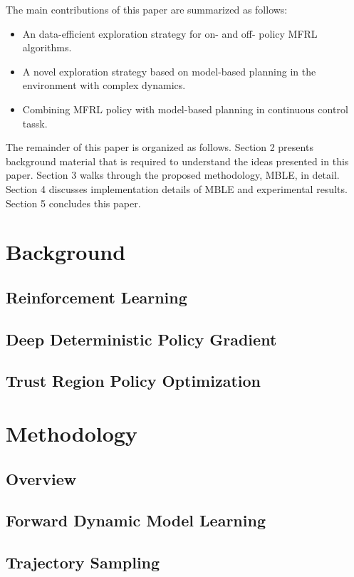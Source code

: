 \documentclass{article} %
\begin{document}
The main contributions of this paper are summarized as follows:
\begin{itemize}
    \item An data-efficient exploration strategy for on- and off- policy MFRL algorithms.
    \item A novel exploration strategy based on model-based planning in the environment with complex dynamics.
    \item Combining MFRL policy with model-based planning in continuous control tassk.
\end{itemize}
The remainder of this paper is organized as follows. Section 2 presents background material that is required to understand the ideas presented in this paper. Section 3 walks through the proposed methodology, MBLE, in detail. Section 4 discusses implementation details of MBLE and experimental results. Section 5 concludes this paper.

\section{Background}
\subsection{Reinforcement Learning}
\subsection{Deep Deterministic Policy Gradient}
\subsection{Trust Region Policy Optimization}

\section{Methodology}
\subsection{Overview}

\subsection{Forward Dynamic Model Learning}
\subsection{Trajectory Sampling}
\end{document}
